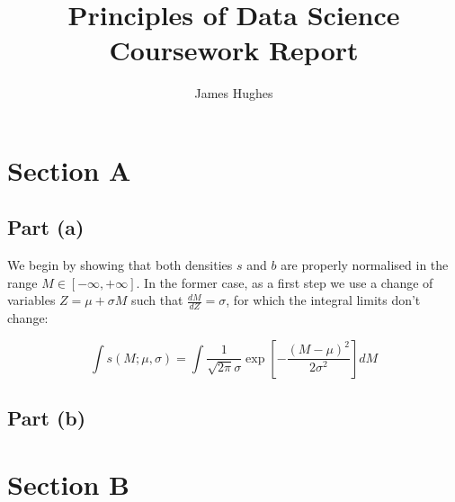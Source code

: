 \documentclass[12pt]{article}
\title{Principles of Data Science Coursework Report}
\author{James Hughes}
\begin{document}
\maketitle
\newpage


\section{Section A}

\subsection{Part (a)}

We begin by showing that both densities $s$ and $b$ are properly normalised in the range $M\in [-\infty, +\infty]$. In the former case, as a first step we use a change of variables $Z = \mu + \sigma M$ such that $\frac{dM}{dZ} = \sigma$, for which the integral limits don't change:

\[
    \int s(M;\mu, \sigma) = \int \frac{1}{\sqrt{2\pi}\sigma}\exp \left[-\frac{(M-\mu)^2}{2\sigma^2}\right]dM
\]

\subsection{Part (b)}

\section{Section B}
\end{document}

